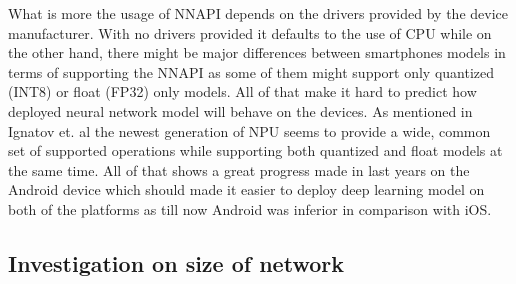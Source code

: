 \documentclass[a4paper,conference]{IEEEtran}
\begin{document}
What is more the usage of NNAPI depends on the drivers provided by the device manufacturer. With no drivers provided it defaults to the use of CPU while on the other hand, there might be major differences between smartphones models in terms of supporting the NNAPI as some of them might support only quantized (INT8) or float (FP32) only models. All of that make it hard to predict how deployed neural network model will behave on the devices. As mentioned in Ignatov et. al\cite{aiMobileBenchmark} the newest generation of NPU seems to provide a wide, common set of supported operations while supporting both quantized and float models at the same time. All of that shows a great progress made in last years on the Android device which should made it easier to deploy deep learning model on both of the platforms as till now Android was inferior in comparison with iOS.



\subsection{Investigation on size of network}


\end{document}
